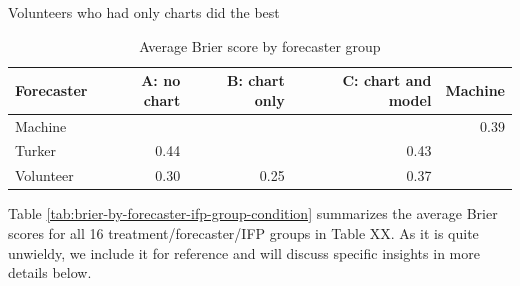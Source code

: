 \documentclass[]{article}
\begin{document}
Volunteers who had only charts did the best

\begin{table}

\caption{\label{tab:brier-by-forecaster-condition}Average Brier score by forecaster group}
\centering
\begin{tabular}[t]{lrrrr}
\toprule
Forecaster & A: no chart & B: chart only & C: chart and model & Machine\\
\midrule
Machine &  &  &  & 0.39\\
Turker & 0.44 &  & 0.43 & \\
Volunteer & 0.30 & 0.25 & 0.37 & \\
\bottomrule
\end{tabular}
\end{table}

Table \ref{tab:brier-by-forecaster-ifp-group-condition} summarizes the
average Brier scores for all 16 treatment/forecaster/IFP groups in Table
XX. As it is quite unwieldy, we include it for reference and will
discuss specific insights in more details below.
\end{document}
